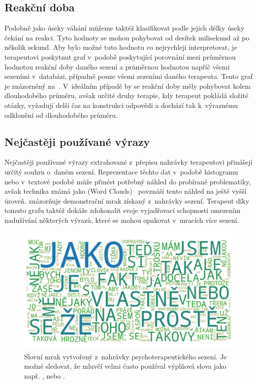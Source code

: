 
\subsection{Reakční doba}
Podobně jako úseky váhání můžeme taktéž klasifikovat podle jejich délky úseky čekání na reakci. Tyto hodnoty se mohou pohybovat od desítek milisekund až po několik sekund. Aby bylo možné tuto hodnotu co nejrychleji interpretovat, je terapeutovi poskytnut graf v~podobě  poskytující porovnání mezi průměrnou hodnotou reakční doby daného sezení a průměrnou hodnotou napříč všemi sezeními v~databázi, případně pouze všemi sezeními daného terapeuta. Tento graf je znázorněný na~. V~ideálním případě by se reakční doby měly pohybovat kolem dlouhodobého průměru, avšak určité druhy terapie, kdy terapeut pokládá složité otázky, vyžadují delší čas na konstrukci odpovědi a dochází tak k~výraznému odklonění od dlouhodobého průměru.


\subsection{Nejčastěji používané výrazy}
Nejčastěji používané výrazy extrahované z~přepisu nahrávky terapeutovi přinášejí určitý souhrn o~daném sezení. Reprezentace těchto dat v~podobě histogramu nebo v~textové podobě může přinést potřebný náhled do probírané problematiky, avšak technika známá jako  (Word Clouds)~\cite{word_cloud} povznáší tento náhled na ještě vyšší úroveň.  znázorňuje demonstrační mrak získaný z~nahrávky sezení. Terapeut díky tomuto grafu taktéž dokáže zdokonalit svoje vyjadřovací schopnosti omezením nadužívání některých výrazů, které se mohou opakovat v~mracích více sezení.

\begin{figure}[ht]
  \centering
  \includegraphics[width=\linewidth]{obrazky-figures/text_plots/word_cloud.pdf}
  \caption{Slovní mrak vytvořený z~nahrávky psychoterapeutického sezení. Je možné sledovat, že mluvčí velmi často používal výplňová slova jako např. ,  nebo .}
  \label{fig:Statisctics_word_cloud}
\end{figure}

